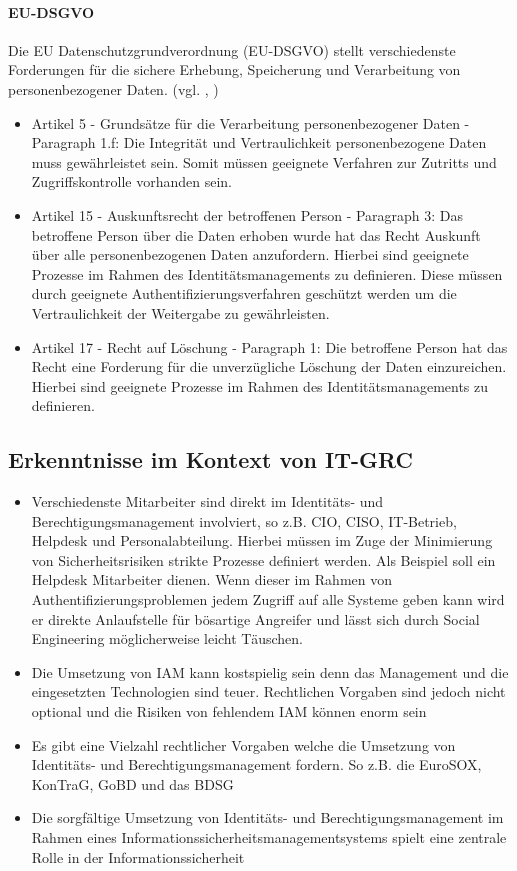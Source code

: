 \documentclass[11pt]{article}
\begin{document}
\paragraph{EU-DSGVO}
Die EU Datenschutzgrundverordnung (EU-DSGVO) stellt verschiedenste Forderungen für die sichere Erhebung, Speicherung und Verarbeitung von personenbezogener Daten. (vgl. \cite{Hindle_2020}, \cite{eu2016})
\begin{itemize}
  \item Artikel 5 - Grundsätze für die Verarbeitung personenbezogener Daten - Paragraph 1.f: Die Integrität und Vertraulichkeit personenbezogene Daten muss gewährleistet sein. Somit müssen geeignete Verfahren zur Zutritts und Zugriffskontrolle vorhanden sein.
  \item Artikel 15 - Auskunftsrecht der betroffenen Person - Paragraph 3: Das betroffene Person über die Daten erhoben wurde hat das Recht Auskunft über alle personenbezogenen Daten anzufordern. Hierbei sind geeignete Prozesse im Rahmen des Identitätsmanagements zu definieren. Diese müssen durch geeignete Authentifizierungsverfahren geschützt werden um die Vertraulichkeit der Weitergabe zu gewährleisten.
  \item Artikel 17 - Recht auf Löschung - Paragraph 1: Die betroffene Person hat das Recht eine Forderung für die unverzügliche Löschung der Daten einzureichen. Hierbei sind geeignete Prozesse im Rahmen des Identitätsmanagements zu definieren.
\end{itemize}
\subsection{Erkenntnisse im Kontext von IT-GRC}
\begin{itemize}
  \item Verschiedenste Mitarbeiter sind direkt im Identitäts- und Berechtigungsmanagement involviert, so z.B. CIO, CISO, IT-Betrieb, Helpdesk und Personalabteilung. Hierbei müssen im Zuge der Minimierung von Sicherheitsrisiken strikte Prozesse definiert werden. Als Beispiel soll ein Helpdesk Mitarbeiter dienen. Wenn dieser im Rahmen von Authentifizierungsproblemen jedem Zugriff auf alle Systeme geben kann wird er direkte Anlaufstelle für bösartige Angreifer und lässt sich durch Social Engineering möglicherweise leicht Täuschen.
  \item Die Umsetzung von IAM kann kostspielig sein denn das Management und die eingesetzten Technologien sind teuer. Rechtlichen Vorgaben sind jedoch nicht optional und die Risiken von fehlendem IAM können enorm sein
  \item Es gibt eine Vielzahl rechtlicher Vorgaben welche die Umsetzung von Identitäts- und Berechtigungsmanagement fordern. So z.B. die EuroSOX, KonTraG, GoBD und das BDSG
  \item Die sorgfältige Umsetzung von Identitäts- und Berechtigungsmanagement im Rahmen eines Informationssicherheitsmanagementsystems spielt eine zentrale Rolle in der Informationssicherheit
\end{itemize}
\end{document}
